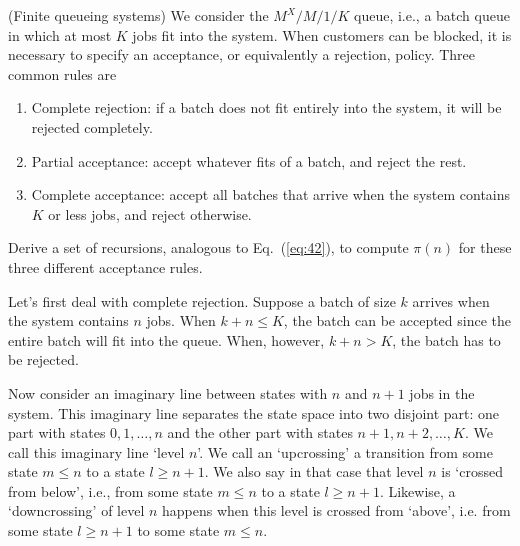 \begin{question}(Finite queueing systems) We consider the $M^X/M/1/K$
queue, i.e., a batch queue in which at most $K$ jobs fit into the
system. When customers can be blocked, it is necessary to specify an
acceptance, or equivalently a rejection, policy. Three common rules are
\begin{enumerate}
\item Complete rejection: if a batch does not fit entirely into the system, it will be rejected completely.
\item Partial acceptance: accept whatever fits of a batch, and reject the rest.
\item Complete acceptance: accept all batches that arrive when the
  system contains $K$ or less jobs, and reject otherwise.
\end{enumerate}
Derive a set of recursions, analogous to Eq.~(\ref{eq:42}), to compute
$\pi(n)$ for these three different acceptance rules.  

\begin{solution}

  Let's first deal with complete rejection. Suppose a batch of size
  $k$ arrives when the system contains $n$ jobs. When $k+n \leq K$,
  the batch can be accepted since the entire batch will fit into the
  queue.  When, however, $k+n> K$, the batch has to be rejected. 

  Now consider an imaginary line between states with $n$ and $n+1$
  jobs in the system. This imaginary line separates the state space
  into two disjoint part: one part with states $0, 1, \ldots, n$ and
  the other part with states $n+1, n+2, \ldots, K$. We call this
  imaginary line `level $n$'.  We call an `upcrossing' a transition
  from some state $m\leq n$ to a state $l\geq n+1$. We also say in
  that case that level $n$ is `crossed from below', i.e., from some
  state $m\leq n$ to a state $l\geq n+1$. Likewise, a `downcrossing'
  of level $n$ happens when this level is crossed from `above',
  i.e. from some state $l\geq n+1$ to some state $m\leq n$.



\end{solution}
\end{question}
